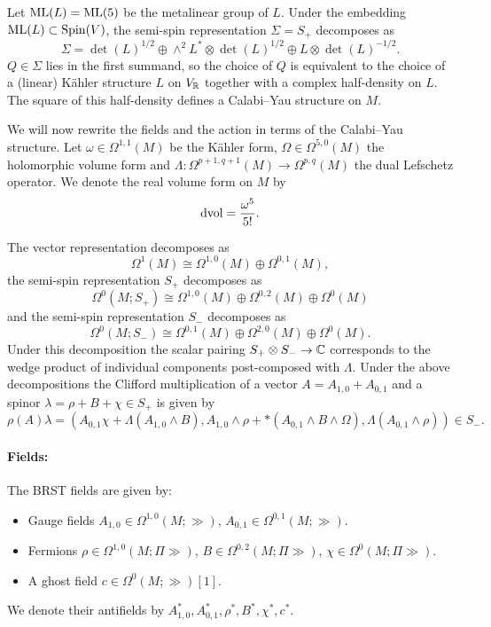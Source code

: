 \documentclass[10pt, oneside]{article}
\begin{document}
Let $\mathrm{ML}(L) = \mathrm{ML}(5)$ be the metalinear group of $L$. Under the embedding $\mathrm{ML}(L)\subset \mathrm{Spin}(V)$, the semi-spin representation $\Sigma=S_+$ decomposes as
\[\Sigma = \det(L)^{1/2} \oplus \wedge^2 L^*\otimes \det(L)^{1/2}\oplus L\otimes \det(L)^{-1/2}.\]
$Q\in\Sigma$ lies in the first summand, so the choice of $Q$ is equivalent to the choice of a (linear) K\"ahler structure $L$ on $V_\mathbb R$ together with a complex half-density on $L$. The square of this half-density defines a Calabi--Yau structure on $M$.

We will now rewrite the fields and the action in terms of the Calabi--Yau structure. Let $\omega\in\Omega^{1, 1}(M)$ be the K\"ahler form, $\Omega\in\Omega^{5, 0}(M)$ the holomorphic volume form and $\Lambda\colon \Omega^{p+1, q+1}(M)\rightarrow \Omega^{p, q}(M)$ the dual Lefschetz operator. We denote the real volume form on $M$ by
\[\operatorname{dvol} = \frac{\omega^5}{5!}.\]

The vector representation decomposes as
\[\Omega^1(M)\cong \Omega^{1, 0}(M)\oplus \Omega^{0, 1}(M),\]
the semi-spin representation $S_+$ decomposes as
\[\Omega^0(M; S_+)\cong \Omega^{1, 0}(M)\oplus \Omega^{0, 2}(M)\oplus \Omega^0(M)\]
and the semi-spin representation $S_-$ decomposes as
\[\Omega^0(M; S_-)\cong \Omega^{0, 1}(M)\oplus \Omega^{2, 0}(M)\oplus \Omega^0(M).\]
Under this decomposition the scalar pairing $S_+\otimes S_-\rightarrow \mathbb C$ corresponds to the wedge product of individual components post-composed with $\Lambda$. Under the above decompositions the Clifford multiplication of a vector $A = A_{1, 0} + A_{0, 1}$ and a spinor $\lambda = \rho + B + \chi\in S_+$ is given by
\[\rho(A)\lambda = (A_{0, 1}\chi + \Lambda(A_{1, 0}\wedge B), A_{1, 0}\wedge \rho + \ast(A_{0, 1}\wedge B\wedge\Omega), \Lambda(A_{0, 1}\wedge \rho))\in S_-.\]

\vspace{-10pt}
\paragraph{Fields:} The BRST fields are given by:
\begin{itemize}
\item Gauge fields $A_{1, 0}\in\Omega^{1, 0}(M; \gg)$, $A_{0, 1}\in\Omega^{0, 1}(M; \gg)$.
\item Fermions $\rho\in\Omega^{1, 0}(M; \Pi\gg)$, $B\in\Omega^{0, 2}(M; \Pi\gg)$, $\chi\in\Omega^0(M; \Pi\gg)$.
\item A ghost field $c\in\Omega^0(M; \gg)[1]$.
\end{itemize}
We denote their antifields by $A_{1, 0}^*, A_{0, 1}^*, \rho^*, B^*, \chi^*, c^*$.
\end{document}
